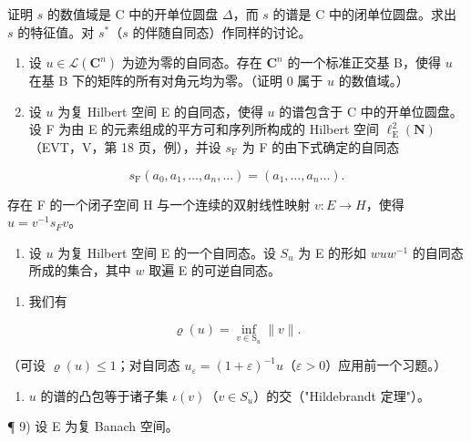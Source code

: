 证明 \(s\) 的数值域是 C 中的开单位圆盘 \(\Delta\)，而 \(s\) 的谱是 C 中的闭单位圆盘。求出 \(s\) 的特征值。对 \(s^{*}\)（\(s\) 的伴随自同态）作同样的讨论。

\begin{enumerate}
\def\labelenumi{\arabic{enumi})}
\setcounter{enumi}{5}
\item
  设 \(u \in \mathcal{L}(\mathbf{C}^n)\) 为迹为零的自同态。存在 \(\mathbf{C}^n\) 的一个标准正交基 B，使得 \(u\) 在基 B 下的矩阵的所有对角元均为零。（证明 0 属于 \(u\) 的数值域。）
\item
  设 \(u\) 为复 Hilbert 空间 E 的自同态，使得 \(u\) 的谱包含于 C 中的开单位圆盘。设 F 为由 E 的元素组成的平方可和序列所构成的 Hilbert 空间 \(\ell_{\mathrm{E}}^{2}(\mathbf{N})\)（EVT，V，第 18 页，例），并设 \(s_{\mathrm{F}}\) 为 F 的由下式确定的自同态
\end{enumerate}

\[
s _ {\mathrm{F}} (a _ {0}, a _ {1}, \ldots , a _ {n}, \ldots) = (a _ {1}, \ldots , a _ {n} \ldots).
\]

存在 F 的一个闭子空间 H 与一个连续的双射线性映射 \(v: E \rightarrow H\)，使得 \(u = v^{-1}s_{F}v\)。

\begin{enumerate}
\def\labelenumi{\arabic{enumi})}
\setcounter{enumi}{7}
\tightlist
\item
  设 \(u\) 为复 Hilbert 空间 E 的一个自同态。设 \(S_u\) 为 E 的形如 \(wuw^{-1}\) 的自同态所成的集合，其中 \(w\) 取遍 E 的可逆自同态。
\end{enumerate}

\begin{enumerate}
\def\labelenumi{\alph{enumi})}
\tightlist
\item
  我们有
\end{enumerate}

\[
\varrho (u) = \inf _ {v \in \mathrm{S} _ {u}} \| v \|.
\]

（可设 \(\varrho(u) \leqslant 1\)；对自同态 \(u_{\varepsilon} = (1 + \varepsilon)^{-1} u\)（\(\varepsilon > 0\)）应用前一个习题。）

\begin{enumerate}
\def\labelenumi{\alph{enumi})}
\setcounter{enumi}{1}
\tightlist
\item
  \(u\) 的谱的凸包等于诸子集 \(\iota(v)\)（\(v \in S_u\)）的交（"Hildebrandt 定理"）。
\end{enumerate}

¶ 9) 设 E 为复 Banach 空间。

